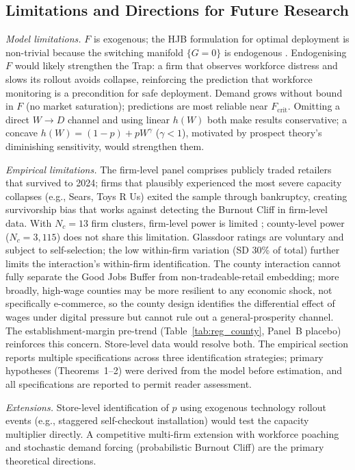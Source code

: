 \documentclass[msom,dblanonrev]{informs4}
\begin{document}
\subsection{Limitations and Directions for Future Research}\label{sec:disc:limits}

\textit{Model limitations.} $F$ is exogenous; the HJB formulation for optimal deployment is non-trivial because the switching manifold $\{G{=}0\}$ is endogenous \citep{filippov1988differential}. Endogenising $F$ would likely strengthen the Trap: a firm that observes workforce distress and slows its rollout avoids collapse, reinforcing the prediction that workforce monitoring is a precondition for safe deployment. Demand grows without bound in $F$ (no market saturation); predictions are most reliable near $F_{\mathrm{crit}}$. Omitting a direct $W \to D$ channel and using linear $h(W)$ both make results conservative; a concave $h(W) = (1{-}p)+pW^\gamma$ ($\gamma < 1$), motivated by prospect theory's diminishing sensitivity, would strengthen them.

\textit{Empirical limitations.} The firm-level panel comprises publicly traded retailers that survived to 2024; firms that plausibly experienced the most severe capacity collapses (e.g., Sears, Toys R Us) exited the sample through bankruptcy, creating survivorship bias that works against detecting the Burnout Cliff in firm-level data. With $N_c = 13$ firm clusters, firm-level power is limited \citep{cameron2008bootstrap}; county-level power ($N_c = 3{,}115$) does not share this limitation. Glassdoor ratings are voluntary and subject to self-selection; the low within-firm variation (SD 30\% of total) further limits the interaction's within-firm identification. The county interaction cannot fully separate the Good Jobs Buffer from non-tradeable-retail embedding; more broadly, high-wage counties may be more resilient to any economic shock, not specifically e-commerce, so the county design identifies the differential effect of wages under digital pressure but cannot rule out a general-prosperity channel. The establishment-margin pre-trend (Table~\ref{tab:reg_county}, Panel~B placebo) reinforces this concern. Store-level data would resolve both. The empirical section reports multiple specifications across three identification strategies; primary hypotheses (Theorems~1--2) were derived from the model before estimation, and all specifications are reported to permit reader assessment.

\textit{Extensions.} Store-level identification of $p$ using exogenous technology rollout events (e.g., staggered self-checkout installation) would test the capacity multiplier directly. A competitive multi-firm extension with workforce poaching and stochastic demand forcing (probabilistic Burnout Cliff) are the primary theoretical directions.
\end{document}
